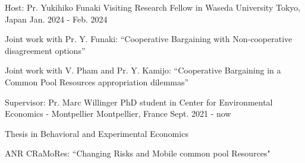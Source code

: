 

\begin{cventries}

  \cventry
    {Host: Pr. Yukihiko Funaki} %
    {Visiting Research Fellow in Waseda University} %
    {Tokyo, Japan} %
    {Jan. 2024 - Feb. 2024} %
    {
      \begin{cvitems} %
        \item {Joint work with Pr. Y. Funaki: ``Cooperative Bargaining with Non-cooperative disagreement options”}
        \item {Joint work with V. Pham and Pr. Y. Kamijo: ``Cooperative Bargaining in a Common Pool Resources appropriation dilemmas”}
      \end{cvitems}
    }

  \cventry
    {Supervisor: Pr. Marc Willinger} %
    {PhD student in Center for Environmental Economics - Montpellier} %
    {Montpellier, France} %
    {Sept. 2021 - now} %
    {
      \begin{cvitems} %
        \item {Thesis in Behavioral and Experimental Economics }
        \item {ANR CRaMoRes: ``Changing Risks and Mobile common pool Resources"}
      \end{cvitems}
    }

\end{cventries}
